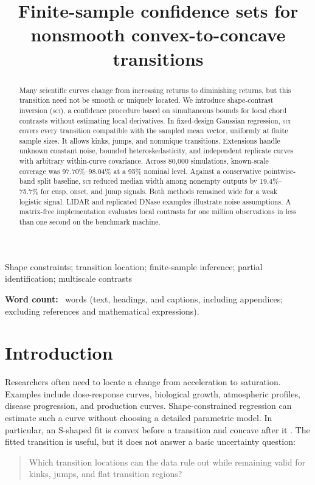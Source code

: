 \documentclass{interact}
\theoremstyle{definition}
\theoremstyle{remark}
\newcommand{\SCI}{\textnormal{\textsc{sci}}\xspace}
\begin{document}
\title{Finite-sample confidence sets for nonsmooth convex-to-concave transitions}
\author{
}
\maketitle

\begin{abstract}
Many scientific curves change from increasing returns to diminishing returns,
but this transition need not be smooth or uniquely located.  We introduce
shape-contrast inversion (\SCI), a confidence procedure based on simultaneous
bounds for local chord contrasts without estimating local derivatives.  In
fixed-design Gaussian regression, \SCI covers every transition compatible
with the sampled mean vector, uniformly at finite sample sizes.  It allows
kinks, jumps, and nonunique transitions.  Extensions handle unknown constant
noise, bounded heteroskedasticity, and independent replicate curves with
arbitrary within-curve covariance.  Across 80,000 simulations, known-scale
coverage was 97.70\%--98.04\% at a 95\% nominal level.  Against a conservative
pointwise-band split baseline, \SCI reduced median width among nonempty
outputs by 19.4\%--75.7\% for cusp, onset, and jump signals.  Both methods
remained wide for a weak logistic signal.  LIDAR and replicated DNase examples
illustrate noise assumptions.  A matrix-free implementation evaluates local contrasts
for one million observations in less than one second on the benchmark machine.
\end{abstract}

\begin{keywords}
Shape constraints; transition location; finite-sample inference;
partial identification; multiscale contrasts
\end{keywords}

\noindent\textbf{Word count:} \unskip\ words
(text, headings, and captions, including appendices; excluding references
and mathematical expressions).

\section{Introduction}

Researchers often need to locate a change from acceleration to saturation.
Examples include dose-response curves, biological growth, atmospheric
profiles, disease progression, and production curves.  Shape-constrained
regression can estimate such a curve without choosing a detailed parametric
model.  In particular, an S-shaped fit is convex before a transition and
concave after it \citep{feng2022sshaped}.  The fitted transition is useful, but
it does not answer a basic uncertainty question:
\begin{quote}
Which transition locations can the data rule out while remaining valid for
kinks, jumps, and flat transition regions?
\end{quote}
\end{document}
